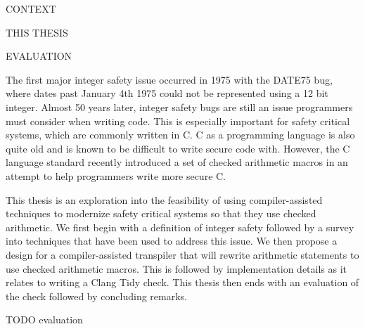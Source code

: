 \abstract

CONTEXT

THIS THESIS

EVALUATION

The first major integer safety issue occurred in 1975 with the DATE75 bug, where dates past January 4th 1975 could not be represented using a 12 bit integer. Almost 50 years later, integer safety bugs are still an issue programmers must consider when writing code. This is especially important for safety critical systems, which are commonly written in C. C as a programming language is also quite old and is known to be difficult to write secure code with. However, the C language standard recently introduced a set of checked arithmetic macros in an attempt to help programmers write more secure C.

This thesis is an exploration into the feasibility of using compiler-assisted techniques to modernize safety critical systems so that they use checked arithmetic. We first begin with a definition of integer safety followed by a survey into techniques that have been used to address this issue. We then propose a design for a compiler-assisted transpiler that will rewrite arithmetic statements to use checked arithmetic macros. This is followed by implementation details as it relates to writing a Clang Tidy check. This thesis then ends with an evaluation of the check followed by concluding remarks.

TODO evaluation
